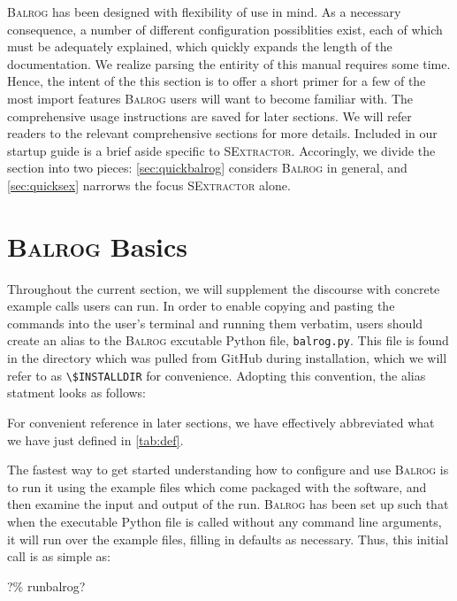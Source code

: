 \documentclass[12pt]{book}
\newcommand{\codett}[1]{\lstinline{#1}}
\newcommand{\py}{Python}
\newcommand{\balrog}{\textsc{Balrog}}
\newcommand{\sex}{\textsc{SExtractor}}
\newcommand{\bcmd}{\% runbalrog}
\begin{document}
\balrog{} has been designed with flexibility of use in mind. As a necessary consequence, 
a number of different configuration possiblities exist, each of which must be
adequately explained, which quickly expands the length of the documentation.
We realize parsing the entirity of this manual requires some time.
Hence, the intent of the this section is to offer a short primer for a few of the most import features
\balrog{} users will want to become familiar with.
The comprehensive usage instructions are saved for later sections.
We will refer readers to the relevant comprehensive sections for more details.
Included in our startup guide is a brief aside specific to \sex{}.
Accoringly, we divide the section into two pieces:
\autoref{sec:quickbalrog} considers \balrog{} in general,
and \autoref{sec:quicksex} narrorws the focus \sex{} alone.


\section{\balrog{} Basics}
\label{sec:quickbalrog}

Throughout the current section, we will supplement the discourse with concrete example calls users can run.
In order to enable copying and pasting the commands into the user's terminal and running them verbatim,
users should create an alias to the \balrog{} excutable \py{} file, \codett{balrog.py}. 
This file is found in the directory which was pulled from GitHub during installation,
which we will refer to as \codett{\$INSTALLDIR} for convenience.
Adopting this convention, the alias statment looks as follows:

\begin{cmdline}
\end{cmdline}

\noindent For convenient reference in later sections, we have effectively 
abbreviated what we have just defined in \autoref{tab:def}.

The fastest way to get started understanding how to configure and use \balrog{} is to
run it using the example files which come packaged with the software, and then examine the input
and output of the run. 
\balrog{} has been set up such that when the executable \py{}
file is called without any command line arguments, it will run over
the example files, filling in defaults as necessary. 
Thus, this initial call is as simple as:

\begin{cmdline}
?\bcmd{}?
\end{cmdline}
\end{document}

